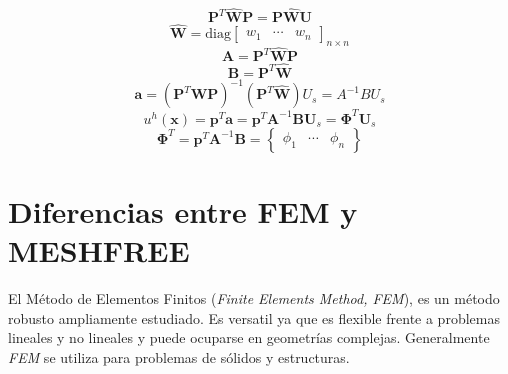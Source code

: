 \begin{equation}
    \bm{P}^T \hat{\bm{W}} \bm{P} = \bm{P} \hat{\bm{W}} \bm{U}
\end{equation}
\begin{equation}
    \hat{\bm{W}} = \mbox{diag} \begin{bmatrix} w_1 & \cdots & w_n \end{bmatrix}_{n \times n}
\end{equation}
\begin{equation}
    \bm{A} = \bm{P}^T \hat{\bm{W}} \bm{P}
\end{equation}
\begin{equation}
    \bm{B} = \bm{P}^T \hat{\bm{W}}
\end{equation}
\begin{equation}
    \bm{a} = \left( \bm{P}^T \hat{\bm{W}} \bm{P} \right)^{-1} \left( \bm{P}^T \hat{\bm{W}} \right) U_s = A^{-1} B U_s
\end{equation}
\begin{equation}
    u^h(\bm{x}) = \bm{p}^T \bm{a} = \bm{p}^T \bm{A}^{-1} \bm{B} \bm{U}_s = \bm{\Phi}^T  \bm{U}_s
\end{equation}
\begin{equation}
    \bm{\Phi}^T = \bm{p}^T \bm{A}^{-1} \bm{B} = \begin{Bmatrix} \phi_1 & \cdots & \phi_n \end{Bmatrix}
\end{equation}





\section{Diferencias entre FEM y MESHFREE}

El Método de Elementos Finitos (\textit{Finite Elements Method, FEM}), es un método robusto ampliamente estudiado. Es versatil ya que es flexible frente a problemas lineales y no lineales y puede ocuparse en geometrías complejas. Generalmente \textit{FEM} se utiliza para problemas de sólidos y estructuras.

